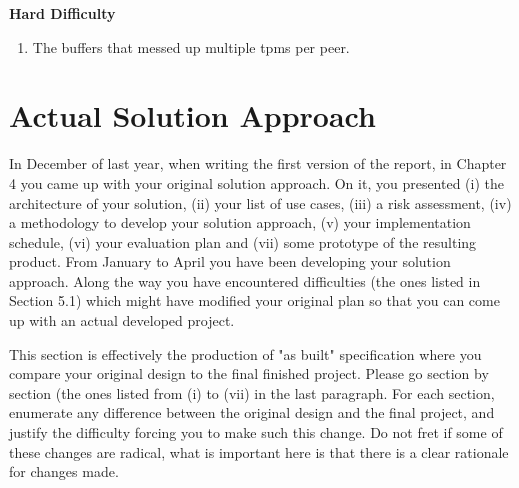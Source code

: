 \textbf{Hard Difficulty}
\begin{enumerate}
\item The buffers that messed up multiple tpms per peer.
\end{enumerate}



\section{Actual Solution Approach}
In December of last year, when writing the first version of the report, in Chapter 4 you came up with your original solution approach. On it, you presented (i) the architecture of your solution, (ii) your list of use cases, (iii) a risk assessment, (iv) a methodology to develop your solution approach, (v) your implementation schedule, (vi) your evaluation plan and (vii) some prototype of the resulting product. From January to April you have been developing your solution approach. Along the way you have encountered difficulties (the ones listed in Section 5.1) which might have modified your original plan so that you can come up with an actual developed project.

This section is effectively the production of "as built" specification where you compare your original design to the final finished project. Please go section by section (the ones listed from (i) to (vii) in the last paragraph. For each section, enumerate any difference between the original design and the final project, and justify the difficulty forcing you to make such this change. Do not fret if some of these changes are radical, what is important here is that there is a clear rationale for changes made.